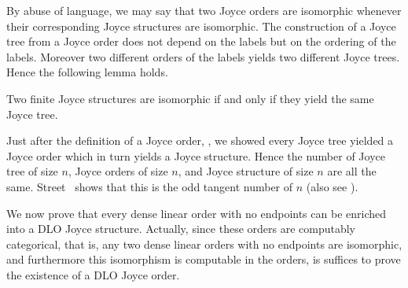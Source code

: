 By abuse of language, we may say that two Joyce orders are isomorphic whenever their corresponding Joyce structures are isomorphic. The construction of a Joyce tree from a Joyce order does not depend on the labels but on the  ordering of the labels.  Moreover two different orders of the labels yields two different Joyce trees. Hence the following lemma holds.

\begin{lemma}[$\RCA_0$]
Two finite Joyce structures are isomorphic if and only if they yield the same Joyce tree.
\end{lemma}

Just after the definition of a Joyce order, , we showed every Joyce tree yielded a Joyce order which in turn yields a Joyce structure. Hence the number of Joyce tree of size $n$, Joyce orders of size $n$, and Joyce structure of size $n$ are all the same. Street~\cite{streets} shows that this is the odd tangent number of $n$ (also see \cite[p.~147]{Todorcevic2010Ramsey}).

We now prove that every dense linear order with no endpoints can be enriched into a DLO Joyce structure. Actually, since these orders are computably categorical, that is, any two dense linear orders with no endpoints are isomorphic, and furthermore this isomorphism is computable in the orders, is suffices to prove the existence of a DLO Joyce order.


